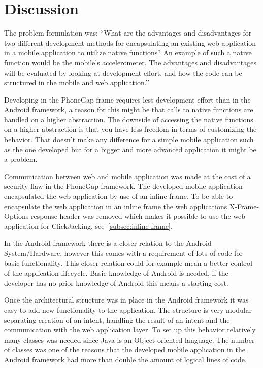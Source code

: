 \chapter{Discussion} \label{ch:discussion}
The problem formulation was:
``What are the advantages and disadvantages for two different development methods for encapsulating an existing web application in a mobile application to utilize native functions? An example of such a native function would be the mobile's accelerometer. The advantages and disadvantages will be evaluated by looking at development effort, and how the code can be structured in the mobile and web application.’’

Developing in the PhoneGap frame requires less development effort than in the Android framework, a reason for this might be that calls to native functions are handled on a higher abstraction. The downside of accessing the native functions on a higher abstraction is that you have less freedom in terms of customizing the behavior. That doesn’t make any difference for a simple mobile application such as the one developed but for a bigger and more advanced application it might be a problem. 

Communication between web and mobile application was made at the cost of a security flaw in the PhoneGap framework. The developed mobile application encapsulated the web application by use of an inline frame. To be able to encapsulate the web application in an inline frame the web applications X-Frame-Options response header was removed which makes it possible to use the web application for ClickJacking, see~\ref{subsec:inline-frame}. 

In the Android framework there is a closer relation to the Android System/Hardware, however this comes with a requirement of lots of code for basic functionality. This closer relation could for example mean a better control of the application lifecycle. Basic knowledge of Android is needed, if the developer has no prior knowledge of Android this means a starting cost. 

Once the architectural structure was in place in the Android framework it was easy to add new functionality to the application. The structure is very modular separating creation of an intent, handling the result of an intent and the communication with the web application layer. To set up this behavior relatively many classes was needed since Java is an Object oriented language. The number of classes was one of the reasons that the developed mobile application in the Android framework had more than double the amount of logical lines of code. 


